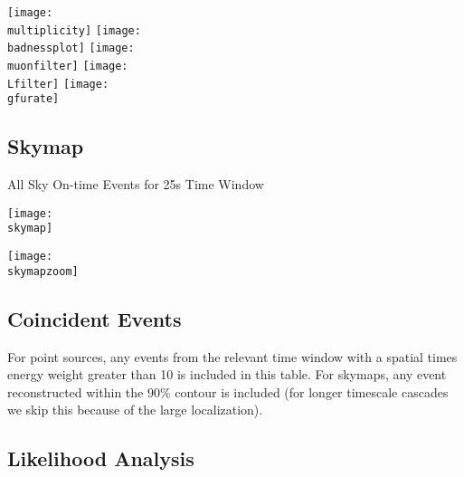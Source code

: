 \documentclass[titlepage]{article}
\begin{document}
\vspace{1em}
{
 \centering
 \texttt{[image: \\multiplicity]}
 \texttt{[image: \\badnessplot]}
 \texttt{[image: \\muonfilter]}
 \texttt{[image: \\Lfilter]}
 \texttt{[image: \\gfurate]}
}


%
%
%
%
%
%
%

\pagebreak
\subsection{Skymap}

{
  \centering
  {\Large All Sky On-time Events for 25s Time Window}

  \texttt{[image: \\skymap]}

  \texttt{[image: \\skymapzoom]}

}
\pagebreak


\subsection{Coincident Events}
For point sources, any events from the relevant time window with a spatial times energy weight greater than 10 is included in this table. For skymaps, any event reconstructed within the 90\% contour is included (for longer timescale cascades we skip this because of the large localization).
\event

\subsection{Likelihood Analysis}
\results
\pagebreak

\backgroundpdfplot

\survivialfunctionplot
\end{document}

